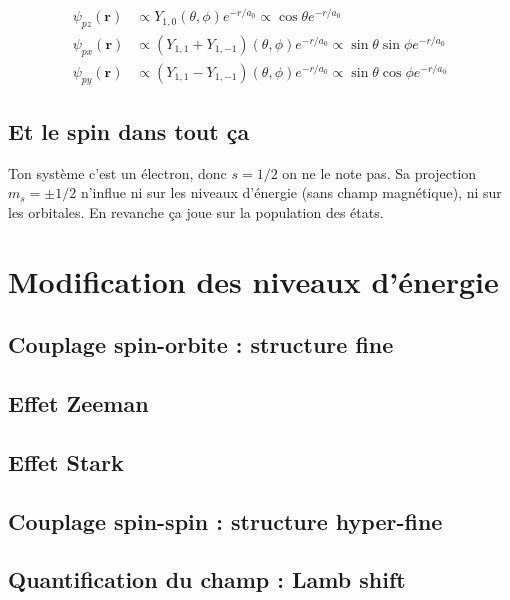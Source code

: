 \documentclass[a4paper]{report}
\begin{document}
\begin{align}
\psi_{pz}(\bm r) &\propto Y_{1,0}(\theta,\phi) e^{-r/a_0} \propto \cos \theta  e^{-r/a_0} \\
\psi_{px}(\bm r) &\propto (Y_{1,1}+Y_{1,-1})(\theta,\phi) e^{-r/a_0} \propto \sin \theta \sin \phi e^{-r/a_0} \\
\psi_{py}(\bm r) &\propto (Y_{1,1}-Y_{1,-1})(\theta,\phi) e^{-r/a_0} \propto \sin \theta \cos \phi e^{-r/a_0}
\end{align}

\subsection{Et le spin dans tout ça}
Ton système c'est un électron, donc $s=1/2$ on ne le note pas. Sa projection $m_s=\pm 1/2$ n'influe ni sur les niveaux d'énergie (sans champ magnétique), ni sur les orbitales. En revanche ça joue sur la population des états.

\section{Modification des niveaux d'énergie}
\subsection{Couplage spin-orbite : structure fine}
\subsection{Effet Zeeman}
\subsection{Effet Stark}
\subsection{Couplage spin-spin : structure hyper-fine}
\subsection{Quantification du champ : Lamb shift}

  
\end{document}
